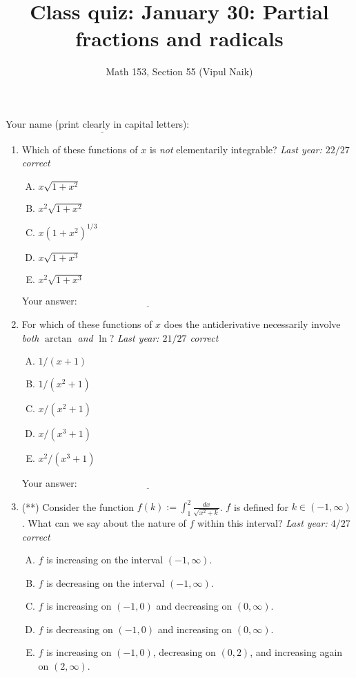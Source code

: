 \documentclass[10pt]{amsart}
\title{Class quiz: January 30: Partial fractions and radicals}
\author{Math 153, Section 55 (Vipul Naik)}
\begin{document}
\maketitle

Your name (print clearly in capital letters): $\underline{\qquad\qquad\qquad\qquad\qquad\qquad\qquad\qquad\qquad\qquad}$

\begin{enumerate}
\item Which of these functions of $x$ is {\em not} elementarily
  integrable? {\em Last year: $22/27$ correct}

  \begin{enumerate}[(A)]
  \item $x\sqrt{1 + x^2}$
  \item $x^2\sqrt{1 + x^2}$
  \item $x(1 + x^2)^{1/3}$
  \item $x\sqrt{1 + x^3}$
  \item $x^2\sqrt{1 + x^3}$
  \end{enumerate}

  \vspace{0.1in}
  Your answer: $\underline{\qquad\qquad\qquad\qquad\qquad\qquad\qquad}$
  \vspace{0.1in}
\item For which of these functions of $x$ does the antiderivative
  necessarily involve {\em both} $\arctan$ {\em and} $\ln$? {\em Last
  year: $21/27$ correct}

  \begin{enumerate}[(A)]
  \item $1/(x + 1)$
  \item $1/(x^2 + 1)$
  \item $x/(x^2 + 1)$
  \item $x/(x^3 + 1)$
  \item $x^2/(x^3 + 1)$
  \end{enumerate}

  \vspace{0.1in}
  Your answer: $\underline{\qquad\qquad\qquad\qquad\qquad\qquad\qquad}$
  \vspace{0.1in}

\item (**) Consider the function $f(k) := \int_1^2 \frac{dx}{\sqrt{x^2 +
  k}}$. $f$ is defined for $k \in (-1,\infty)$. What can we say about
  the nature of $f$ within this interval? {\em Last year: $4/27$ correct}

  \begin{enumerate}[(A)]
  \item $f$ is increasing on the interval $(-1,\infty)$.
  \item $f$ is decreasing on the interval $(-1,\infty)$.
  \item $f$ is increasing on $(-1,0)$ and decreasing on $(0,\infty)$.
  \item $f$ is decreasing on $(-1,0)$ and increasing on $(0,\infty)$.
  \item $f$ is increasing on $(-1,0)$, decreasing on $(0,2)$, and
    increasing again on $(2,\infty)$.
  \end{enumerate}


\end{enumerate}
\end{document}
